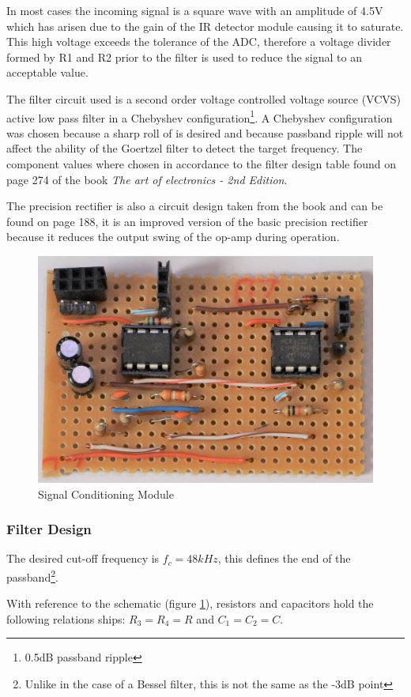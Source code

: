 In most cases the incoming signal is a square wave with an amplitude of 4.5V which has arisen due to the gain of the IR detector module causing it to saturate. This high voltage exceeds the tolerance of the ADC, therefore a voltage divider formed by R1 and R2 prior to the filter is used to reduce the signal to an acceptable value.

The filter circuit used is a second order voltage controlled voltage source (VCVS) active low pass filter in a Chebyshev configuration\footnote{0.5dB passband ripple}. A Chebyshev configuration was chosen because a sharp roll of is desired and because passband ripple will not affect the ability of the Goertzel filter to detect the target frequency. The component values where chosen in accordance to the filter design table found on page 274 of the book \textit{The art of electronics - 2nd Edition}\cite{Horowitz1995}.

The precision rectifier is also a circuit design taken from the book and can be found on page 188, it is an improved version of the basic precision rectifier because it reduces the output swing of the op-amp during operation\cite{Horowitz1995}.

\begin{figure}[H]
	\centering
	\includegraphics[width=.6\textwidth]{figures/modules/filtering_conditioning.jpg}
	\caption{Signal Conditioning Module}
	\label{fig:module_filtering_conditioning}
\end{figure}

\subsubsection{Filter Design}


The desired cut-off frequency is \(f_{c} = 48kHz\), this defines the end of the passband\footnote{Unlike in the case of a Bessel filter, this is not the same as the -3dB point}.

With reference to the schematic (figure \ref{fig:module_filtering_conditioning}), resistors and capacitors hold the following relations ships: \(R_3 = R_4 = R\) and \(C_1 = C_2 = C\).


